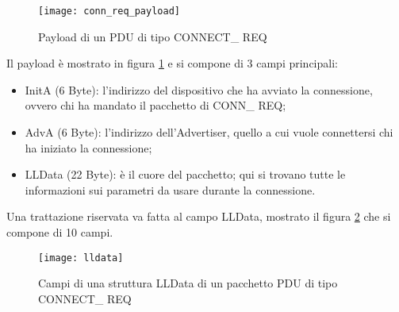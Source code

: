 \begin{figure}[H]
\texttt{[image: conn\_req\_payload]}
\centering
\caption{Payload di un PDU di tipo CONNECT\_ REQ }
\label{conn_req_payload}
\end{figure}

Il payload è mostrato in figura \ref{conn_req_payload} e si compone di 3 campi principali: 
\begin{itemize}
\item InitA (6 Byte): l'indirizzo del dispositivo che ha avviato la connessione, ovvero chi ha mandato il pacchetto di CONN\_ REQ;
\item AdvA (6 Byte): l'indirizzo dell'Advertiser, quello a cui vuole connettersi chi ha iniziato la connessione;
\item LLData (22 Byte): è il cuore del pacchetto; qui si trovano tutte le informazioni sui parametri da usare durante la connessione.
\end{itemize}

Una trattazione riservata va fatta al campo LLData, mostrato il figura \ref{lldata} che si compone di 10 campi.

\begin{figure}[H]
\texttt{[image: lldata]}
\centering
\caption{Campi di una struttura LLData di un pacchetto PDU di tipo CONNECT\_ REQ}
\label{lldata}
\end{figure}


